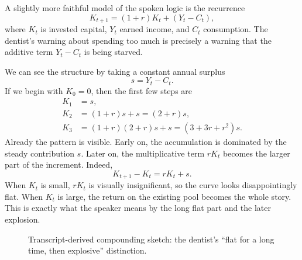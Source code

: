 A slightly more faithful model of the spoken logic is the recurrence
\begin{equation}
K_{t+1} = (1+r)K_t + (Y_t - C_t),
\end{equation}
where \(K_t\) is invested capital, \(Y_t\) earned income, and \(C_t\) consumption. The dentist's warning about spending too much is precisely a warning that the additive term \(Y_t-C_t\) is being starved.

We can see the structure by taking a constant annual surplus
\begin{equation}
s = Y_t - C_t.
\end{equation}
If we begin with \(K_0=0\), then the first few steps are
\begin{align}
K_1 &= s,\\
K_2 &= (1+r)s + s = (2+r)s,\\
K_3 &= (1+r)(2+r)s + s = (3+3r+r^2)s.
\end{align}
Already the pattern is visible. Early on, the accumulation is dominated by the steady contribution \(s\). Later on, the multiplicative term \(rK_t\) becomes the larger part of the increment. Indeed,
\begin{equation}
K_{t+1} - K_t = rK_t + s.
\end{equation}
When \(K_t\) is small, \(rK_t\) is visually insignificant, so the curve looks disappointingly flat. When \(K_t\) is large, the return on the existing pool becomes the whole story. This is exactly what the speaker means by the long flat part and the later explosion.

\begin{figure}[h]
\centering
{}
\caption{Transcript-derived compounding sketch: the dentist's ``flat for a long time, then explosive'' distinction.}
\end{figure}

